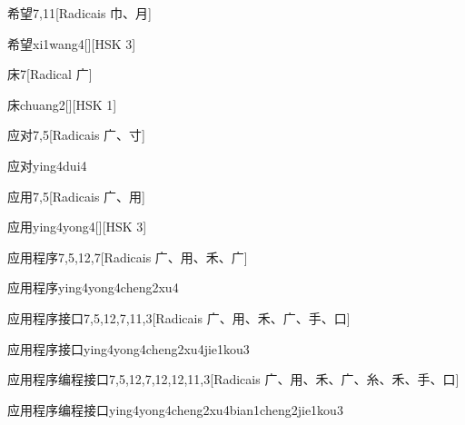 \begin{entry}{希望}{7,11}[Radicais ⼱、⽉]
  \begin{phonetics}{希望}{xi1wang4}[][HSK 3]
  \end{phonetics}
\end{entry}

\begin{entry}{床}{7}[Radical ⼴]
  \begin{phonetics}{床}{chuang2}[][HSK 1]
  \end{phonetics}
\end{entry}

\begin{entry}{应对}{7,5}[Radicais ⼴、⼨]
  \begin{phonetics}{应对}{ying4dui4}
  \end{phonetics}
\end{entry}

\begin{entry}{应用}{7,5}[Radicais ⼴、⽤]
  \begin{phonetics}{应用}{ying4yong4}[][HSK 3]
  \end{phonetics}
\end{entry}

\begin{entry}{应用程序}{7,5,12,7}[Radicais ⼴、⽤、⽲、⼴]
  \begin{phonetics}{应用程序}{ying4yong4cheng2xu4}
  \end{phonetics}
\end{entry}

\begin{entry}{应用程序接口}{7,5,12,7,11,3}[Radicais ⼴、⽤、⽲、⼴、⼿、⼝]
  \begin{phonetics}{应用程序接口}{ying4yong4cheng2xu4jie1kou3}
  \end{phonetics}
\end{entry}

\begin{entry*}{应用程序编程接口}{7,5,12,7,12,12,11,3}[Radicais ⼴、⽤、⽲、⼴、⽷、⽲、⼿、⼝]
  \begin{phonetics}{应用程序编程接口}{ying4yong4cheng2xu4bian1cheng2jie1kou3}
  \end{phonetics}
\end{entry*}

